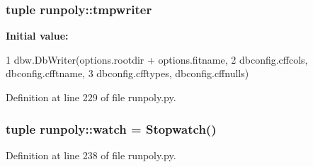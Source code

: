 \hypertarget{namespacerunpoly_ac9f61a81e4f1d37afe226eb29a552c68}{
\subsubsection[{tmpwriter}]{\setlength{\rightskip}{0pt plus 5cm}tuple {\bf runpoly::tmpwriter}}}
\label{namespacerunpoly_ac9f61a81e4f1d37afe226eb29a552c68}
{\bfseries Initial value:}
\begin{DoxyCode}
1 dbw.DbWriter(options.rootdir + options.fitname, 
2                              dbconfig.cffcols, dbconfig.cfftname, 
3                              dbconfig.cfftypes, dbconfig.cffnulls)
\end{DoxyCode}


Definition at line 229 of file runpoly.py.

\hypertarget{namespacerunpoly_ac573a8d4d7a1ebbf405bd0b69fa9361b}{
\subsubsection[{watch}]{\setlength{\rightskip}{0pt plus 5cm}tuple {\bf runpoly::watch} = Stopwatch()}}
\label{namespacerunpoly_ac573a8d4d7a1ebbf405bd0b69fa9361b}


Definition at line 238 of file runpoly.py.

